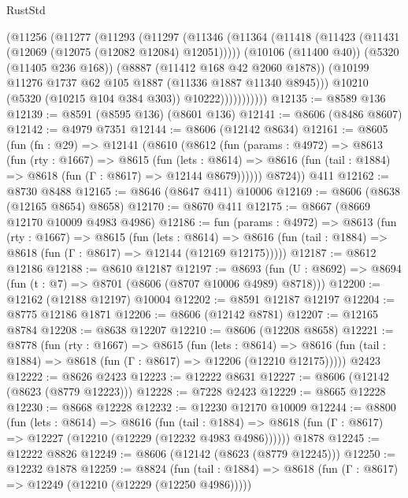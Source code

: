 \begin{lexlean}{RustStd}
\begin{coremodule}
                (@11256
                  (@11277
                    (@11293
                      (@11297
                        (@11346
                          (@11364
                            (@11418 (@11423 (@11431 (@12069 (@12075 (@12082 @12084) @12051)))))
                            (@10106 (@11400 @40))
                            (@5320 (@11405 @236 @168))
                            (@8887 (@11412 @168 @42 @2060 @1878))
                            (@10199 @11276 @1737 @62 @105 @1887 (@11336 @1887 @11340 @8945)))
                          @10210
                          (@5320 (@10215 @104 @384 @303))
                          @10222)))))))))))
@12135 := @8589 @136
@12139 := @8591 (@8595 @136) (@8601 @136)
@12141 := @8606 (@8486 @8607)
@12142 := @4979 @7351
@12144 := @8606 (@12142 @8634)
@12161 := @8605
    (fun (fn : @29) =>
    @12141
      (@8610
        (@8612
          (fun (params : @4972) =>
          @8613
            (fun (rty : @1667) =>
            @8615
              (fun (lets : @8614) =>
              @8616 (fun (tail : @1884) => @8618 (fun (Γ : @8617) => @12144 @8679))))))
        @8724))
    @411
@12162 := @8730 @8488
@12165 := @8646 (@8647 @411) @10006
@12169 := @8606 (@8638 (@12165 @8654) @8658)
@12170 := @8670 @411
@12175 := @8667 (@8669 @12170 @10009 @4983 @4986)
@12186 := fun (params : @4972) =>
  @8613
    (fun (rty : @1667) =>
    @8615
      (fun (lets : @8614) =>
      @8616 (fun (tail : @1884) => @8618 (fun (Γ : @8617) => @12144 (@12169 @12175)))))
@12187 := @8612 @12186
@12188 := @8610 @12187
@12197 := @8693
    (fun (U : @8692) => @8694 (fun (t : @7) => @8701 (@8606 (@8707 @10006 @4989) @8718)))
@12200 := @12162 (@12188 @12197) @10004
@12202 := @8591 @12187 @12197
@12204 := @8775 @12186 @1871
@12206 := @8606 (@12142 @8781)
@12207 := @12165 @8784
@12208 := @8638 @12207
@12210 := @8606 (@12208 @8658)
@12221 := @8778
    (fun (rty : @1667) =>
    @8615
      (fun (lets : @8614) =>
      @8616 (fun (tail : @1884) => @8618 (fun (Γ : @8617) => @12206 (@12210 @12175)))))
    @2423
@12222 := @8626 @2423
@12223 := @12222 @8631
@12227 := @8606 (@12142 (@8623 (@8779 @12223)))
@12228 := @7228 @2423
@12229 := @8665 @12228
@12230 := @8668 @12228
@12232 := @12230 @12170 @10009
@12244 := @8800
    (fun (lets : @8614) =>
    @8616
      (fun (tail : @1884) =>
      @8618 (fun (Γ : @8617) => @12227 (@12210 (@12229 (@12232 @4983 @4986))))))
    @1878
@12245 := @12222 @8826
@12249 := @8606 (@12142 (@8623 (@8779 @12245)))
@12250 := @12232 @1878
@12259 := @8824
    (fun (tail : @1884) => @8618 (fun (Γ : @8617) => @12249 (@12210 (@12229 (@12250 @4986)))))

\end{coremodule}
\end{lexlean}
